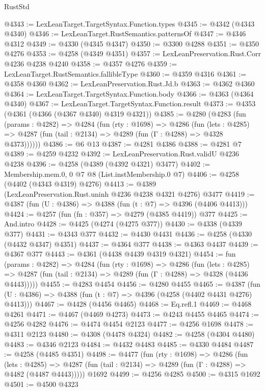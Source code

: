 \begin{lexlean}{RustStd}
\begin{coremodule}
{\begin{coremodule}
{{{{{{{{{{{{{{{{@4343 := LexLeanTarget.TargetSyntax.Function.types
@4345 := @4342 (@4343 @4340)
@4346 := LexLeanTarget.RustSemantics.patternsOf
@4347 := @4346 @4312
@4349 := @4330 (@4345 @4347)
@4350 := @3300 @4288
@4351 := @4350 @4276
@4353 := @4258 (@4349 @4351)
@4357 := LexLeanPreservation.Rust.Corr @4236 @4238 @4240
@4358 := @4357 @4276
@4359 := LexLeanTarget.RustSemantics.fallibleType
@4360 := @4359 @4316
@4361 := @4358 @4360
@4362 := LexLeanPreservation.Rust.Jd.b
@4363 := @4362 @4360
@4364 := LexLeanTarget.TargetSyntax.Function.body
@4366 := @4363 (@4364 @4340)
@4367 := LexLeanTarget.TargetSyntax.Function.result
@4373 := @4353 (@4361 (@4366 (@4367 @4340) @4319 @4321))
@4385 := @4280
    (@4283
      (fun (params : @4282) =>
      @4284
        (fun (rty : @1698) =>
        @4286
          (fun (lets : @4285) =>
          @4287 (fun (tail : @2134) => @4289 (fun (Γ : @4288) => @4328 @4373))))))
@4386 := @6 @13
@4387 := @4281 @4386
@4388 := @4281 @7
@4389 := @4259 @4232
@4392 := LexLeanPreservation.Rust.validU @4236 @4238
@4396 := @4258 (@4389 (@4392 @4321) @3477)
@4402 := Membership.mem.{0, 0} @7 @8 (List.instMembership.{0} @7)
@4406 := @4258 (@4402 (@4343 @4319) @4276)
@4413 := @4389 (LexLeanPreservation.Rust.uninh @4236 @4238 @4321 @4276) @3477
@4419 := @4387 (fun (U : @4386) => @4388 (fun (t : @7) => @4396 (@4406 @4413)))
@4424 := @4257 (fun (fn : @357) => @4279 (@4385 @4419)) @377
@4425 := And.intro
@4428 := @4425 (@4274 (@4275 @377))
@4430 := @4338 (@4339 @377)
@4431 := @4343 @377
@4432 := @4430 @4431
@4436 := @4258 (@4330 (@4432 @4347) @4351)
@4437 := @4364 @377
@4438 := @4363 @4437
@4439 := @4367 @377
@4443 := @4361 (@4438 @4439 @4319 @4321)
@4454 := fun (params : @4282) =>
  @4284
    (fun (rty : @1698) =>
    @4286
      (fun (lets : @4285) =>
      @4287 (fun (tail : @2134) => @4289 (fun (Γ : @4288) => @4328 (@4436 @4443)))))
@4455 := @4283 @4454
@4456 := @4280 @4455
@4465 := @4387 (fun (U : @4386) => @4388 (fun (t : @7) => @4396 (@4258 (@4402 @4431 @4276) @4413)))
@4467 := @4428 (@4456 @4465)
@4468 := Eq.refl.{1}
@4469 := @4468 @4261
@4471 := @4467 (@4469 @4273)
@4473 := @4243 @4455 @4465
@4474 := @4256 @4282
@4476 := @4474 @4454 @2123
@4477 := @4256 @1698
@4478 := @4311 @2123
@4480 := @4308 (@4478 @4324)
@4482 := @4258 (@4304 @4480)
@4483 := @4346 @2123
@4484 := @4432 @4483
@4485 := @4330 @4484
@4487 := @4258 (@4485 @4351)
@4498 := @4477
    (fun (rty : @1698) =>
    @4286
      (fun (lets : @4285) =>
      @4287 (fun (tail : @2134) => @4289 (fun (Γ : @4288) => @4482 (@4487 @4443)))))
    @1692
@4499 := @4256 @4285
@4500 := @4315 @1692
@4501 := @4500 @4323
}}}}}}}}}}}}}}}}
\end{coremodule}}
\end{coremodule}
\end{lexlean}

